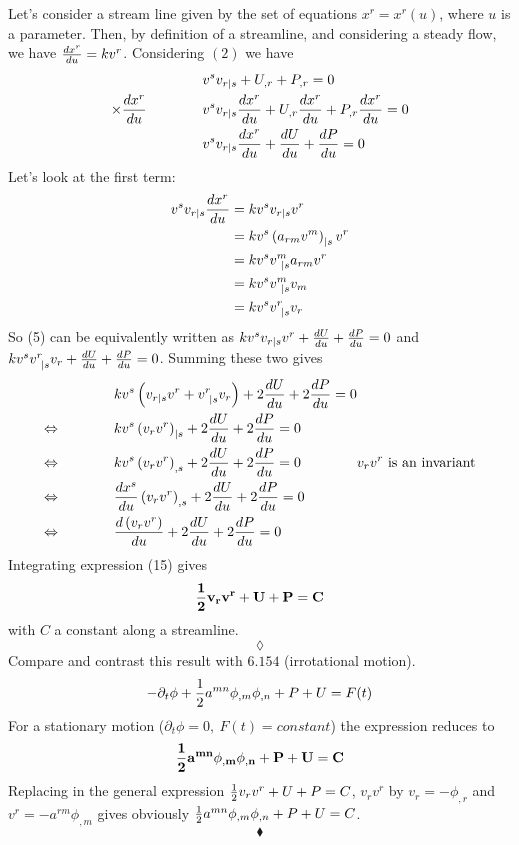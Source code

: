 Let's consider a stream line given by the set of equations $x^r = x^r(u)$, where $u$ is a parameter. Then, by definition of a streamline, and considering a steady flow, we have $\dv{x^r}{u} = kv^r$. Considering $(2)$ we have 
\begin{align}
&v^sv_{r|s} + U_{,r}+P_{,r}= 0\\
\times \dv{x^r}{u} \quad\quad\quad\quad &v^sv_{r|s}\dv{x^r}{u} + U_{,r}\dv{x^r}{u}+P_{,r}\dv{x^r}{u}= 0\\
\quad\quad\quad\quad &v^sv_{r|s}\dv{x^r}{u} + \dv{U}{u}+\dv{P}{u}= 0
\end{align}
Let's look at the first term:
\begin{align}
v^sv_{r|s}\dv{x^r}{u}&=kv^sv_{r|s}v^r\\
&=kv^s\left(a_{rm}v^m\right)_{|s}v^r\\
&=kv^sv^m_{\  |s}a_{rm}v^r\\
&=kv^sv^m_{\ |s}v_m\\
&=kv^sv^r_{\ |s}v_r
\end{align}
So (5) can be equivalently written as $kv^sv_{r|s}v^r + \dv{U}{u}+\dv{P}{u}= 0$ and $kv^sv^r_{\  |s}v_r+ \dv{U}{u}+\dv{P}{u}= 0$. Summing these two gives
\begin{align}
&kv^s\left(v_{r|s}v^r+ v^r_{\  |s}v_r\right) + 2\dv{U}{u}+2\dv{P}{u}= 0\\
\Leftrightarrow\quad\quad\quad\quad &kv^s\left(v_{r}v^r\right)_{|s} + 2\dv{U}{u}+2\dv{P}{u}= 0\\
\Leftrightarrow\quad\quad\quad\quad &kv^s\left(v_{r}v^r\right)_{,s} + 2\dv{U}{u}+2\dv{P}{u}= 0\quad\quad\quad\quad v_{r}v^r \text{ is an invariant}\\
\Leftrightarrow\quad\quad\quad\quad &\dv{x^s}{u}\left(v_{r}v^r\right)_{,s} + 2\dv{U}{u}+2\dv{P}{u}= 0\\
\Leftrightarrow\quad\quad\quad\quad &\dv{\left(v_{r}v^r\right)}{u} + 2\dv{U}{u}+2\dv{P}{u}= 0
\end{align}
Integrating expression (15) gives 
$$\mathbf{\frac{1}{2} v_{r}v^r + U+P= C}$$
with $C$ a constant along a streamline.
$$\lozenge$$
Compare and contrast this result with $\mathbf{6.154}$ (irrotational motion).
$$-\partial_t\phi + \frac{1}{2} a^{mn}\phi_{,m}\phi_{,n}+P+U=F(t)$$
For a stationary motion ($\partial_t\phi=0, \ F(t)=constant$) the expression reduces to 
$$\mathbf{\frac{1}{2} a^{mn}\phi_{,m}\phi_{,n}+P+U=C}$$
Replacing in the general expression $\frac{1}{2} v_{r}v^r + U+P= C$, $v_{r}v^r $ by $v_r = -\phi_{,r}$ and $v^r = -a^{rm}\phi_{,m}$ gives obviously $\frac{1}{2} a^{mn}\phi_{,m}\phi_{,n}+P+U=C$.
 $$\blacklozenge$$
\newpage